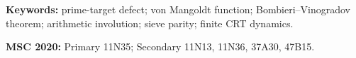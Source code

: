 \documentclass[11pt]{article}
\theoremstyle{definition}
\theoremstyle{remark}
\begin{document}
\noindent\textbf{Keywords:} prime-target defect; von Mangoldt function; Bombieri--Vinogradov theorem; arithmetic involution; sieve parity; finite CRT dynamics.

\medskip
\noindent\textbf{MSC 2020:} Primary 11N35; Secondary 11N13, 11N36, 37A30, 47B15.









\end{document}
